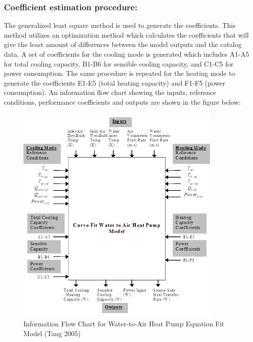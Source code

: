 \subsubsection{Coefficient estimation procedure:}\label{coefficient-estimation-procedure-000}

The generalized least square method is used to generate the coefficients. This method utilizes an optimization method which calculates the coefficients that will give the least amount of differences between the model outputs and the catalog data. A set of coefficients for the cooling mode is generated which includes A1-A5 for total cooling capacity, B1-B6 for sensible cooling capacity, and C1-C5 for power consumption. The same procedure is repeated for the heating mode to generate the coefficients E1-E5 (total heating capacity) and F1-F5 (power consumption). An information flow chart showing the inputs, reference conditions, performance coefficients and outputs are shown in the figure below:

\begin{figure}[hbtp] %
\centering
\includegraphics[width=0.9\textwidth, height=0.9\textheight, keepaspectratio=true]{media/image7286.png}
\caption{Information Flow Chart for Water-to-Air Heat Pump Equation Fit Model (Tang 2005) \protect \label{fig:information-flow-chart-for-water-to-air-heat-001}}
\end{figure}

